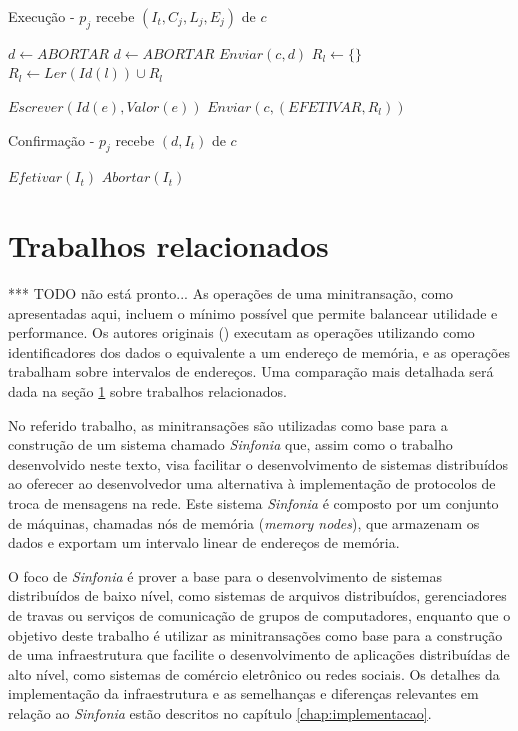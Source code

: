 \documentclass[11pt,twoside,a4paper]{book}
\begin{document}
\begin{algorithm}
\caption{Execução - $p_j$ recebe $(I_t, C_j, L_j, E_j)$ de $c$}
\label{alg:mini_participante1}
\begin{algorithmic}[1]
\State $d \gets ABORTAR$
		\State $d \gets ABORTAR$
	\EndIf
\EndFor
{}
	\State $Enviar(c, d)$
\Else
	$R_l \gets \{\}$
		$R_l \gets Ler(Id(l)) \cup R_l$
	\EndFor
	
		$Escrever(Id(e), Valor(e))$
	\EndFor
	\State $Enviar(c, (EFETIVAR, R_l))$
\EndIf
\end{algorithmic}
\end{algorithm}

\begin{algorithm}
\caption{Confirmação - $p_j$ recebe $(d, I_t)$ de $c$}
\label{alg:mini_participante2}
\begin{algorithmic}[1]
	\State $Efetivar(I_t)$
\Else
	\State $Abortar(I_t)$
\EndIf
\end{algorithmic}
\end{algorithm}

\section{Trabalhos relacionados}
\label{sec:trabalhos_relacionados}
*** TODO não está pronto...
As operações de uma minitransação, como apresentadas aqui, incluem o mínimo possível que permite balancear utilidade e performance. Os autores originais (\cite{sinfonia}) executam as operações utilizando como identificadores dos dados o equivalente a um endereço de memória, e as operações trabalham sobre intervalos de endereços. Uma comparação mais detalhada será dada na seção \ref{sec:trabalhos_relacionados} sobre trabalhos relacionados.

No referido trabalho, as minitransações são utilizadas como base para a construção de um sistema chamado \emph{Sinfonia} que, assim como o trabalho desenvolvido neste texto, visa facilitar o desenvolvimento de sistemas distribuídos ao oferecer ao desenvolvedor uma alternativa à implementação de protocolos de troca de mensagens na rede. Este sistema \emph{Sinfonia} é composto por um conjunto de máquinas, chamadas nós de memória (\emph{memory nodes}), que armazenam os dados e exportam um intervalo linear de endereços de memória. 

O foco de \emph{Sinfonia} é prover a base para o desenvolvimento de sistemas distribuídos de baixo nível, como sistemas de arquivos distribuídos, gerenciadores de travas ou serviços de comunicação de grupos de computadores, enquanto que o objetivo deste trabalho é utilizar as minitransações como base para a construção de uma infraestrutura que facilite o desenvolvimento de aplicações distribuídas de alto nível, como sistemas de comércio eletrônico ou redes sociais. Os detalhes da implementação da infraestrutura e as semelhanças e diferenças relevantes em relação ao \emph{Sinfonia} estão descritos no capítulo \ref{chap:implementacao}.
\end{document}
